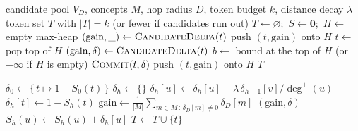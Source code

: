 \begin{algorithm}[h]
\caption{\textsc{SelectTokens}: lazy greedy token selection.}
\label{alg:select-tokens}
\begin{algorithmic}[1]
\Require candidate pool $V_D$, concepts $M$, hop radius $D$, token budget $k$, distance decay $\lambda$
\Ensure token set $T$ with $|T| = k$ (or fewer if candidates run out)
\State $T \gets \varnothing$;\ $S \gets \mathbf{0}$;\ $H \gets$ empty max-heap 
 
    \State $(\mathrm{gain}, \_) \gets \Call{CandidateDelta}{t}$
    \State push $(t, \mathrm{gain})$ onto $H$
\EndFor
{}
  \State $t \gets$ pop top of $H$
  \State $(\mathrm{gain}, \delta) \gets \Call{CandidateDelta}{t}$ 
  \State $b \gets$ bound at the top of $H$ (or $-\infty$ if $H$ is empty)
    \State $\Call{Commit}{t, \delta}$ 
  \Else
    \State push $(t, \mathrm{gain})$ onto $H$ 
  \EndIf
\EndWhile
\State \Return $T$
\end{algorithmic}
\end{algorithm}

\begin{algorithm}[h]
\caption{\textsc{CandidateDelta} and \textsc{Commit}: incremental update. Dictionary entries that are not set are zero.}
\label{alg:candidate-delta}
\begin{algorithmic}[1]
    \State $\delta_0 \gets \{\, t \mapsto 1 - S_0(t) \,\}$ 
        \State $\delta_h \gets \{\}$
                \State $\delta_h[u] \gets \delta_h[u] + \lambda\, \delta_{h-1}[v] / \deg^+(u)$ 
            \EndFor
        \EndFor
        \State $\delta_h[t] \gets 1 - S_h(t)$ 
    \EndFor
    \State $\mathrm{gain} \gets \frac{1}{|M|} \sum_{m \in M \,:\, \delta_D[m] \neq 0} \delta_D[m]$
    \State \Return $(\mathrm{gain}, \delta)$
\EndFunction
{}
            \State $S_h(u) \gets S_h(u) + \delta_h[u]$
        \EndFor
    \EndFor
    \State $T \gets T \cup \{t\}$
\EndFunction
\end{algorithmic}
\end{algorithm}

